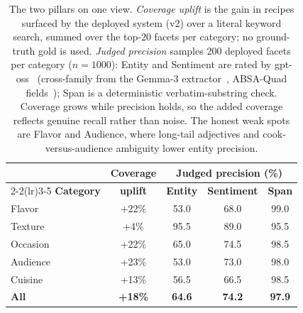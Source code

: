 \begin{table}[t]
\centering
\small
\setlength{\tabcolsep}{6pt}
\begin{tabular}{@{}lcccc@{}}
\toprule
& \textbf{Coverage} & \multicolumn{3}{c}{\textbf{Judged precision (\%)}} \\
\cmidrule(lr){2-2}\cmidrule(lr){3-5}
\textbf{Category} & \textbf{uplift} & \textbf{Entity} & \textbf{Sentiment} & \textbf{Span} \\
\midrule
Flavor   & +22\% & 53.0 & 68.0 & 99.0 \\
Texture  & \phantom{0}+4\% & 95.5 & 89.0 & 95.5 \\
Occasion & +22\% & 65.0 & 74.5 & 98.5 \\
Audience & +23\% & 53.0 & 73.0 & 98.0 \\
Cuisine  & +13\% & 56.5 & 66.5 & 98.5 \\
\midrule
\textbf{All} & \textbf{+18\%} & \textbf{64.6} & \textbf{74.2} & \textbf{97.9} \\
\bottomrule
\end{tabular}
\caption{The two pillars on one view. \emph{Coverage uplift} is the gain in recipes surfaced by the deployed system (v2) over a literal keyword search, summed over the top-20 facets per category; no ground-truth gold is used. \emph{Judged precision} samples 200 deployed facets per category ($n=1000$): Entity and Sentiment are rated by gpt-oss~\cite{openai2025gptoss} (cross-family from the Gemma-3 extractor~\cite{zheng2024judging}, ABSA-Quad fields~\cite{cai2021aspect}); Span is a deterministic verbatim-substring check. Coverage grows while precision holds, so the added coverage reflects genuine recall rather than noise. The honest weak spots are Flavor and Audience, where long-tail adjectives and cook-versus-audience ambiguity lower entity precision.}
\label{tab:coverage-precision}
\end{table}
